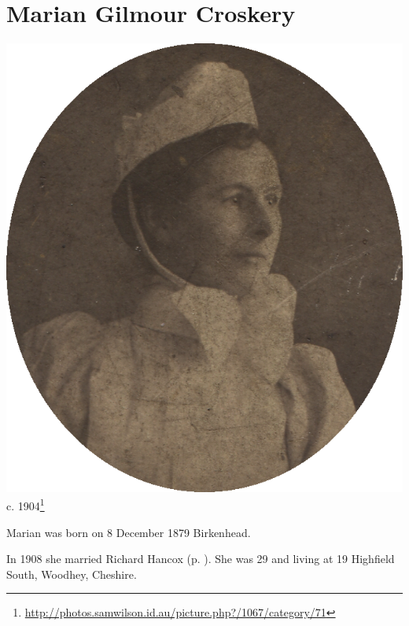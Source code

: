 \section{Marian Gilmour Croskery}\label{Marian_Gilmour_Croskery}

\begin{center}
\includegraphics[width=0.8\linewidth]{photos/Marian_Gilmour_Croskery} \\
{\footnotesize c. 1904\footnote{\url{http://photos.samwilson.id.au/picture.php?/1067/category/71}}}
\end{center}

Marian was born on 8 December 1879 Birkenhead.

In 1908 she married Richard Hancox (p. \pageref{Richard_James_Hancox}). She was 29 and living at 19 Highfield South, Woodhey, Cheshire.
